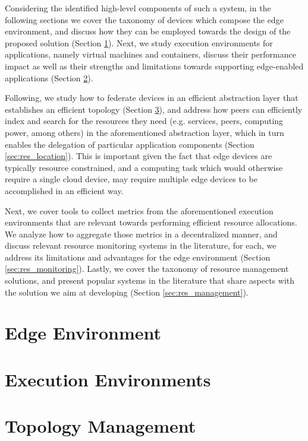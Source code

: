 Considering the identified high-level components of such a system, in the following sections we cover the taxonomy of devices which compose the edge environment, and discuss how they can be employed towards the design of the proposed solution (Section \ref{sec:edge_computing}). Next, we study execution environments for applications, namely virtual machines and containers, discuss their performance impact as well as their strengths and limitations towards supporting edge-enabled applications (Section \ref{sec:runtime_environments}).

Following, we study how to federate devices in an efficient abstraction layer  that establishes an efficient topology (Section \ref{sec:topology_management}), and address how peers can efficiently index and search for the resources they need (e.g. services, peers, computing power, among others) in the aforementioned abstraction layer, which in turn enables the delegation of particular application components (Section \ref{sec:res_location}). This is important given the fact that edge devices are typically resource constrained, and a computing task which would otherwise require a single cloud device, may require multiple edge devices to be accomplished in an efficient way.

Next, we cover tools to collect metrics from the aforementioned execution environments that are relevant towards performing efficient resource allocations. We analyze how to aggregate those metrics in a decentralized manner, and discuss relevant resource monitoring systems in the literature, for each, we address its limitations and advantages for the edge environment (Section \ref{sec:res_monitoring}). Lastly, we cover the taxonomy of resource management solutions, and present popular systems in the literature that share aspects with the solution we aim at developing (Section \ref{sec:res_management}).

\section{Edge Environment} \label{sec:edge_computing} 

\section{Execution Environments} \label{sec:runtime_environments} 

\section{Topology Management} \label{sec:topology_management} 

